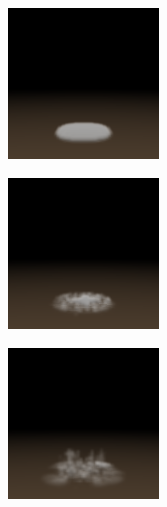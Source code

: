\begin{figure}[htbp]
 \begin{minipage}{0.33\hsize}
  \begin{center}
   \includegraphics[width=40mm]{img/render_50.bmp}
  \end{center}
  \label{fig:four}
 \end{minipage}
 \begin{minipage}{0.33\hsize}
 \begin{center}
  \includegraphics[width=40mm]{img/render_60.bmp}
 \end{center}
  \label{fig:five}
 \end{minipage}
 \begin{minipage}{0.33\hsize}
 \begin{center}
  \includegraphics[width=40mm]{img/render_70.bmp}
 \end{center}
  \label{fig:six}
 \end{minipage}
\end{figure}

